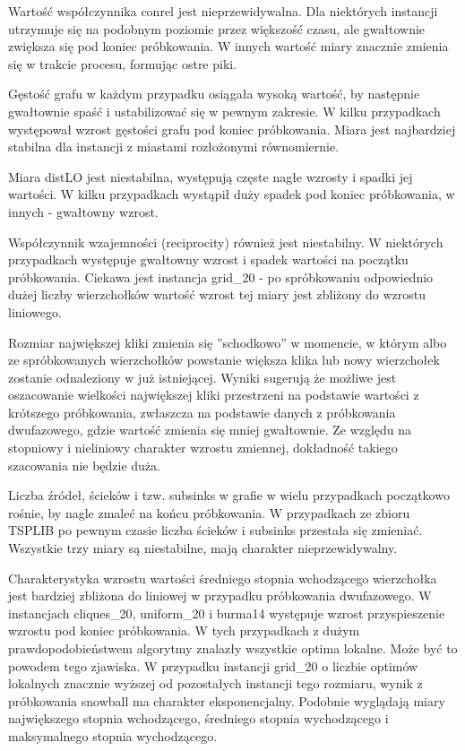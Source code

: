 Wartość współczynnika conrel jest nieprzewidywalna.
Dla niektórych instancji utrzymuje się na podobnym poziomie przez większość czasu,
ale gwałtownie zwiększa się pod koniec próbkowania.
W innych wartość miary znacznie zmienia się w trakcie procesu, formując ostre piki.

Gęstość grafu w każdym przypadku osiągała wysoką wartość, by następnie gwałtownie spaść i ustabilizować się w pewnym zakresie.
W kilku przypadkach występował wzrost gęstości grafu pod koniec próbkowania.
Miara jest najbardziej stabilna dla instancji z miastami rozłożonymi równomiernie.

Miara distLO jest niestabilna, występują częste nagłe wzrosty i spadki jej wartości.
W kilku przypadkach wystąpił duży spadek pod koniec próbkowania, w innych - gwałtowny wzrost.

Współczynnik wzajemności (reciprocity) również jest niestabilny.
W niektórych przypadkach występuje gwałtowny wzrost i spadek wartości na początku próbkowania.
Ciekawa jest instancja grid\_20 - po spróbkowaniu odpowiednio dużej liczby wierzchołków
wartość wzrost tej miary jest zbliżony do wzrostu liniowego.

Rozmiar największej kliki zmienia się ''schodkowo'' w momencie, w którym albo ze spróbkowanych wierzchołków
powstanie większa klika lub nowy wierzchołek zostanie odnaleziony w już istniejącej.
Wyniki sugerują że możliwe jest oszacowanie wielkości największej kliki przestrzeni na podstawie wartości
z krótszego próbkowania, zwłaszcza na podstawie danych z próbkowania dwufazowego, gdzie
wartość zmienia się mniej gwałtownie. Ze względu na stopniowy i nieliniowy charakter wzrostu zmiennej,
dokładność takiego szacowania nie będzie duża.

Liczba źródeł, ścieków i tzw. subsinks w grafie w wielu przypadkach początkowo rośnie, by nagle zmaleć na końcu próbkowania.
W przypadkach ze zbioru TSPLIB po pewnym czasie liczba ścieków i subsinks przestała się zmieniać.
Wszystkie trzy miary są niestabilne, mają charakter nieprzewidywalny.

Charakterystyka wzrostu wartości średniego stopnia wchodzącego wierzchołka jest bardziej zbliżona do liniowej
w przypadku próbkowania dwufazowego. W instancjach cliques\_20, uniform\_20 i burma14 występuje
wzrost przyspieszenie wzrostu pod koniec próbkowania.
W tych przypadkach z dużym prawdopodobieństwem algorytmy znalazły wszystkie optima lokalne.
Może być to powodem tego zjawiska.
W przypadku instancji grid\_20 o liczbie optimów lokalnych znacznie wyższej od pozostałych instancji tego rozmiaru,
wynik z próbkowania snowball ma charakter eksponencjalny.
Podobnie wyglądają miary największego stopnia wchodzącego, średniego stopnia wychodzącego i maksymalnego stopnia wychodzącego.

